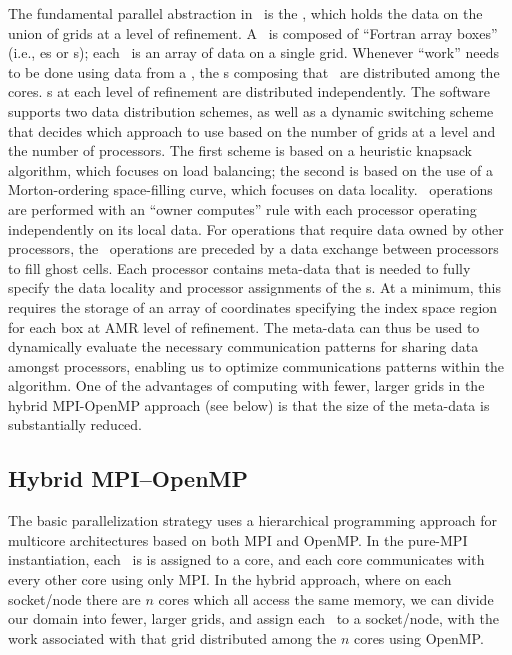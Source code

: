 The fundamental parallel abstraction in \BoxLib\ is the \MultiFab, which holds the data on the 
union of grids at a level of refinement.  A \MultiFab\ is composed of ``Fortran array boxes''
(i.e., \FArrayBox es or \Fab s); each \Fab\ is an array of data on a single grid. 
Whenever ``work'' needs to be done using data from a \MultiFab, the 
\Fab s composing that \MultiFab\ are distributed 
among the cores.  \MultiFab s at each level of refinement are distributed 
independently.  The software supports two data distribution schemes, as well as a 
dynamic switching scheme that decides which approach to use based on the number of 
grids at a level and the number of processors.  The first scheme is based on a 
heuristic knapsack algorithm, which focuses on load balancing; the second is based on 
the use of a Morton-ordering space-filling curve, which focuses on data locality. 
 \MultiFab\ operations are performed with an ``owner computes'' rule 
with each processor operating independently on its local data.  For operations that 
require data owned by other processors, the \MultiFab\ operations are preceded by a 
data exchange between processors to fill ghost cells.  Each processor contains 
meta-data that is needed 
to fully specify the data locality and processor assignments of the \Fab s. At a 
minimum, this requires the storage of an array of coordinates specifying the index space 
region for each box at AMR level of refinement.  The meta-data can thus be used to 
dynamically evaluate the necessary communication patterns for sharing data amongst 
processors, enabling us to optimize communications patterns within the algorithm.
One of the advantages of computing with fewer, larger grids in the hybrid 
MPI-OpenMP approach (see below) is that the size of the meta-data is substantially 
reduced.

\subsection{Hybrid MPI--OpenMP}

The basic parallelization strategy uses a hierarchical programming approach for 
multicore architectures based on both MPI and OpenMP.  In the pure-MPI instantiation, 
each \Fab\ is is assigned to a core, and each core communicates 
with every other core using only MPI.  In the hybrid approach, where on each socket/node 
there are $n$ cores which all access the same memory, we can divide our domain into
fewer, larger grids, and assign each \Fab\ to a socket/node, 
with the work associated with that grid distributed among the $n$ 
cores using OpenMP.

